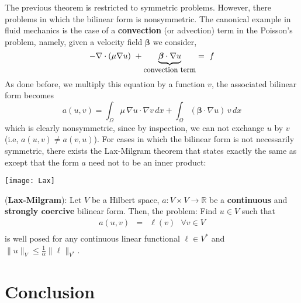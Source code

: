 The previous theorem is restricted to symmetric problems.
However, there problems in which the bilinear form is
nonsymmetric. The canonical example in fluid mechanics
is the case of a \textbf{convection} (or advection)
term in the Poisson's problem, namely, given a velocity
field $\boldsymbol{\beta}$ we consider,
\begin{equation*}
-\nabla \cdot \left ( \mu \nabla{u} \right)~ + \underbrace{\boldsymbol{\beta}\cdot \nabla{u}}_{\mbox{\small convection term}} = ~f
\end{equation*}
As done before, we multiply this equation by a function $v$, the associated bilinear form becomes
\begin{equation*}
a(u,v) = \int_{\Omega}{\mu\,\nabla{u}\cdot \nabla{v}}\,dx + \int_{\Omega}{(\boldsymbol{\beta} \cdot \nabla{u})\,v}\,dx
\end{equation*}
which is clearly nonsymmetric, since by inspection, we can not
exchange $u$ by $v$ (i.e, $a(u,v) \ne a(v,u)$).
For cases in which the bilinear form is not necessarily
symmetric, there exists the Lax-Milgram theorem that states exactly
the same as  except that the form $a$ need not to be an
inner product:
\begin{marginfigure}[0.0cm]
       \texttt{[image: Lax]}
       \caption[]{Peter D. Lax (Hungary, 1926).} 
\end{marginfigure}

\begin{theorem} 
 (\textbf{Lax-Milgram}):
Let $V$ be a Hilbert space,
$a: V \times V \rightarrow \mathbb{R}$ be a \textbf{continuous}
and \textbf{strongly coercive} bilinear form.
Then, the problem: Find $u \in V$ such that
\begin{equation}
\left.
\begin{array}{rll}
a(u,v) & = & \ell(v)  ~~~\forall v \in V \\
\end{array}
\right. \nonumber
\end{equation}
is well posed for any continuous linear functional $\ell \in V^{*}$
and $\lVert u \rVert_V \le \frac{1}{\alpha} \lVert \ell \rVert_{V^{*}}$.
\end{theorem}


\section{Conclusion}

